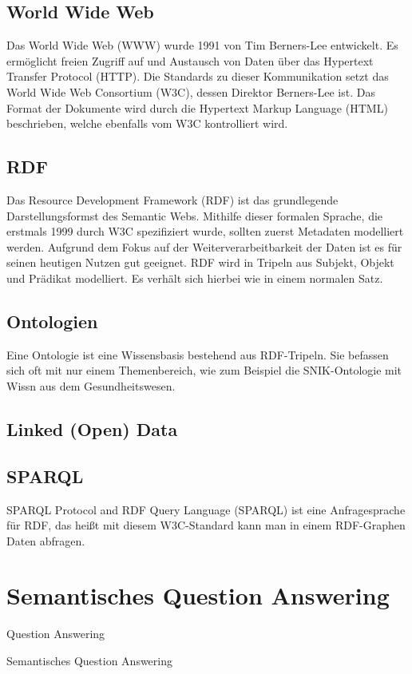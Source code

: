\subsection{World Wide Web}
Das World Wide Web (WWW) wurde 1991 von Tim Berners-Lee entwickelt.
Es ermöglicht freien Zugriff auf und Austausch von Daten über das Hypertext Transfer Protocol (HTTP).
Die Standards zu dieser Kommunikation setzt das World Wide Web Consortium (W3C), dessen Direktor Berners-Lee ist.
Das Format der Dokumente wird durch die Hypertext Markup Language (HTML) beschrieben, welche ebenfalls vom W3C kontrolliert wird.

\subsection{RDF}
Das Resource Development Framework (RDF) ist das grundlegende Darstellungsformst des Semantic Webs.
Mithilfe dieser formalen Sprache, die erstmals 1999 durch W3C spezifiziert wurde, sollten zuerst Metadaten modelliert werden.
Aufgrund dem Fokus auf der Weiterverarbeitbarkeit der Daten ist es für seinen heutigen Nutzen gut geeignet.
RDF wird in Tripeln aus Subjekt, Objekt und Prädikat modelliert. Es verhält sich hierbei wie in einem normalen Satz.

\subsection{Ontologien}
Eine Ontologie ist eine Wissensbasis bestehend aus RDF-Tripeln.
Sie befassen sich oft mit nur einem Themenbereich, wie zum Beispiel die SNIK-Ontologie mit Wissn aus dem Gesundheitswesen.

\subsection{Linked (Open) Data}


\subsection{SPARQL}
SPARQL Protocol and RDF Query Language (SPARQL) ist eine Anfragesprache für RDF, das heißt mit diesem W3C-Standard
kann man in einem RDF-Graphen Daten abfragen.

\section{Semantisches Question Answering}

\begin{definition}{Question Answering}

\end{definition}

\begin{definition}{Semantisches Question Answering}

\end{definition}
